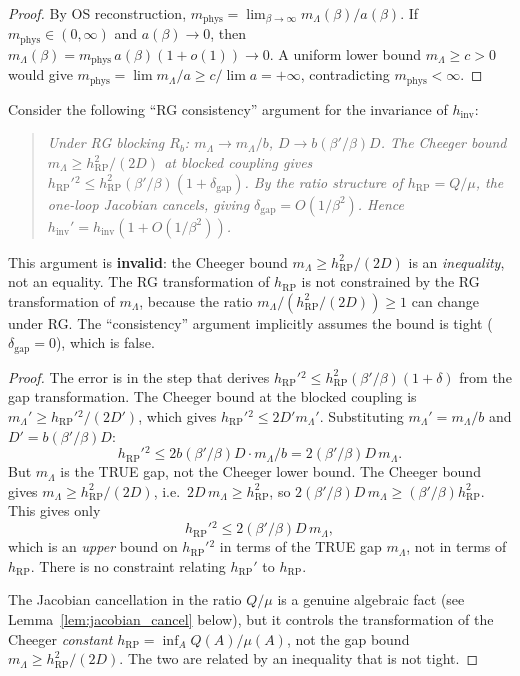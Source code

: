 \begin{proof}
By OS reconstruction, $m_{\mathrm{phys}}=\lim_{\beta\to\infty}
m_{\Lambda}(\beta)/a(\beta)$. If $m_{\mathrm{phys}}\in(0,\infty)$
and $a(\beta)\to0$, then $m_{\Lambda}(\beta)=m_{\mathrm{phys}}\,
a(\beta)(1+o(1))\to0$. A uniform lower bound
$m_{\Lambda}\ge c>0$ would give
$m_{\mathrm{phys}}=\lim m_{\Lambda}/a\ge c/\lim a=+\infty$,
contradicting $m_{\mathrm{phys}}<\infty$.
\end{proof}

\begin{theorem}
\label{thm:rg_covariance_attempt}
Consider the following ``RG consistency'' argument for the
invariance of $h_{\mathrm{inv}}$:
\begin{quote}
\textit{Under RG blocking $R_{b}$: $m_{\Lambda}\to m_{\Lambda}/b$,
$D\to b(\beta'/\beta)D$. The Cheeger bound
$m_{\Lambda}\ge h_{\mathrm{RP}}^{2}/(2D)$ at blocked coupling
gives $h_{\mathrm{RP}}'{}^{2}\le h_{\mathrm{RP}}^{2}(\beta'/\beta)
(1+\delta_{\mathrm{gap}})$. By the ratio structure of $h_{\mathrm{RP}}=Q/\mu$,
the one-loop Jacobian cancels, giving $\delta_{\mathrm{gap}}=O(1/\beta^{2})$.
Hence $h_{\mathrm{inv}}'=h_{\mathrm{inv}}(1+O(1/\beta^{2}))$.}
\end{quote}
This argument is \textbf{invalid}: the Cheeger bound
$m_{\Lambda}\ge h_{\mathrm{RP}}^{2}/(2D)$ is an
\emph{inequality}, not an equality. The RG transformation of
$h_{\mathrm{RP}}$ is not constrained by the RG transformation of
$m_{\Lambda}$, because the ratio
$m_{\Lambda}/(h_{\mathrm{RP}}^{2}/(2D))\ge1$ can change under RG.
The ``consistency'' argument implicitly assumes the bound is
tight ($\delta_{\mathrm{gap}}=0$), which is false.
\end{theorem}

\begin{proof}
The error is in the step that derives
$h_{\mathrm{RP}}'{}^{2}\le h_{\mathrm{RP}}^{2}(\beta'/\beta)(1+\delta)$
from the gap transformation. The Cheeger bound at the blocked
coupling is $m_{\Lambda}'\ge h_{\mathrm{RP}}'{}^{2}/(2D')$, which
gives $h_{\mathrm{RP}}'{}^{2}\le 2D'm_{\Lambda}'$. Substituting
$m_{\Lambda}'=m_{\Lambda}/b$ and $D'=b(\beta'/\beta)D$:
\[
  h_{\mathrm{RP}}'{}^{2}\le 2b(\beta'/\beta)D\cdot m_{\Lambda}/b
  =2(\beta'/\beta)D\,m_{\Lambda}.
\]
But $m_{\Lambda}$ is the TRUE gap, not the Cheeger lower bound.
The Cheeger bound gives $m_{\Lambda}\ge h_{\mathrm{RP}}^{2}/(2D)$,
i.e.\ $2D\,m_{\Lambda}\ge h_{\mathrm{RP}}^{2}$, so
$2(\beta'/\beta)D\,m_{\Lambda}\ge(\beta'/\beta)h_{\mathrm{RP}}^{2}$.
This gives only
\[
  h_{\mathrm{RP}}'{}^{2}\le 2(\beta'/\beta)D\,m_{\Lambda},
\]
which is an \emph{upper} bound on $h_{\mathrm{RP}}'{}^{2}$ in
terms of the TRUE gap $m_{\Lambda}$, not in terms of
$h_{\mathrm{RP}}$. There is no constraint relating
$h_{\mathrm{RP}}'$ to $h_{\mathrm{RP}}$.

The Jacobian cancellation in the ratio $Q/\mu$ is a genuine
algebraic fact (see Lemma~\ref{lem:jacobian_cancel} below), but
it controls the transformation of the Cheeger \emph{constant}
$h_{\mathrm{RP}}=\inf_{A}Q(A)/\mu(A)$, not the gap bound
$m_{\Lambda}\ge h_{\mathrm{RP}}^{2}/(2D)$. The two are related
by an inequality that is not tight.
\end{proof}


